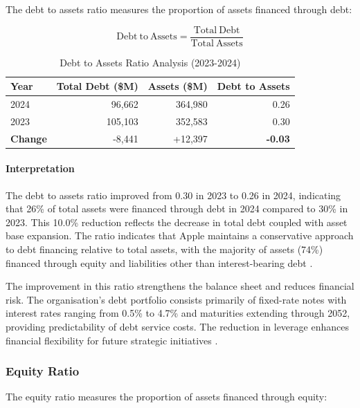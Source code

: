 \documentclass[12pt,a4paper]{article}
\begin{document}
The debt to assets ratio measures the proportion of assets financed through debt:

\begin{equation}
\mathrm{Debt\ to\ Assets} = \frac{\mathrm{Total\ Debt}}{\mathrm{Total\ Assets}}
\end{equation}

\begin{table}[H]
\centering
\caption{Debt to Assets Ratio Analysis (2023-2024)}
\label{tab:da}
\begin{tabular}{lrrr}
\toprule
\textbf{Year} & \textbf{Total Debt (\$M)} & \textbf{Assets (\$M)} & \textbf{Debt to Assets} \\
\midrule
2024 & 96,662 & 364,980 & 0.26 \\
2023 & 105,103 & 352,583 & 0.30 \\
\textbf{Change} & -8,441 & +12,397 & \textbf{-0.03} \\
\bottomrule
\end{tabular}
\end{table}

\paragraph{Interpretation}

The debt to assets ratio improved from 0.30 in 2023 to 0.26 in 2024, indicating that 26\% of total assets were financed through debt in 2024 compared to 30\% in 2023. This 10.0\% reduction reflects the decrease in total debt coupled with asset base expansion. The ratio indicates that Apple maintains a conservative approach to debt financing relative to total assets, with the majority of assets (74\%) financed through equity and liabilities other than interest-bearing debt \citep{apple202410k}.

The improvement in this ratio strengthens the balance sheet and reduces financial risk. The organisation's debt portfolio consists primarily of fixed-rate notes with interest rates ranging from 0.5\% to 4.7\% and maturities extending through 2052, providing predictability of debt service costs. The reduction in leverage enhances financial flexibility for future strategic initiatives \citep{kieso2023}.

\subsubsection{Equity Ratio}

The equity ratio measures the proportion of assets financed through equity:
\end{document}
